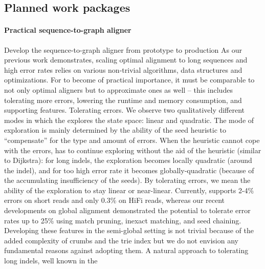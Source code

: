 
\subsection*{Planned work packages}

\paragraph{Practical sequence-to-graph aligner}
Develop the \astarix sequence-to-graph aligner from prototype to production As
our previous work demonstrates, scaling optimal \A alignment to long sequences
and high error rates relies on various non-trivial algorithms, data structures
and optimizations. For \astarix to become of practical importance, it must be
comparable to not only optimal aligners but to approximate ones as well – this
includes tolerating more errors, lowering the runtime and memory consumption,
and supporting features. Tolerating errors. We observe two qualitatively
different modes in which the \A explores the state space: linear and quadratic.
The mode of exploration is mainly determined by the ability of the seed
heuristic to “compensate” for the type and amount of errors. When the heuristic
cannot cope with the errors, \A has to continue exploring without the aid of the
heuristic (similar to Dijkstra): for long indels, the exploration becomes
locally quadratic (around the indel), and for too high error rate it becomes
globally-quadratic (because of the accumulating insufficiency of the seeds). By
tolerating errors, we mean the ability of the exploration to stay linear or
near-linear. Currently, \astarix supports 2-4\% errors on short reads and only
0.3\% on HiFi reads, whereas our recent developments on global alignment
demonstrated the potential to tolerate error rates up to 25\% using match
pruning, inexact matching, and seed chaining. Developing these features in the
semi-global setting is not trivial because of the added complexity of crumbs and
the trie index but we do not envision any fundamental reasons against adopting
them. A natural approach to tolerating long indels, well known in the
